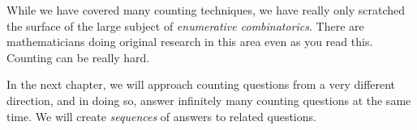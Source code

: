\documentclass[12pt]{article}
\begin{document}
While we have covered many counting techniques, we have really only scratched the surface of the large subject of \emph{enumerative combinatorics}.  There are mathematicians doing original research in this area even as you read this.  Counting can be really hard.

In the next chapter, we will approach counting questions from a very different direction, and in doing so, answer infinitely many counting questions at the same time.  We will create \emph{sequences} of answers to related questions.  
 
\end{document}
